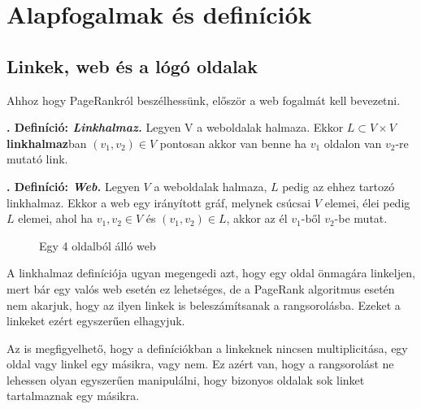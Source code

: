 \documentclass[12pt,a4paper]{article}
\newcounter{definicioszam}
\newenvironment{definicio}[1]
{{\medskip}\noindent \stepcounter{definicioszam}
{\bfseries{\thedefinicioszam. Definíció: \textit{#1.}}}}{\bigskip }
\begin{document}
\section{Alapfogalmak és definíciók}

\subsection{Linkek, web és a lógó oldalak}\label{link_web_logooldal}

Ahhoz hogy PageRankról beszélhessünk, először a web fogalmát kell bevezetni.

\begin{definicio}{Linkhalmaz}
	Legyen V a weboldalak halmaza. Ekkor $L \subset V \times V$ \textbf{linkhalmaz}ban $(v_1, v_2) \in V$ pontosan akkor van benne ha $v_1$ oldalon van $v_2$-re mutató link. 
\end{definicio}

\begin{definicio}{Web}
	Legyen $V$ a weboldalak halmaza, $L$ pedig az ehhez tartozó linkhalmaz. Ekkor a web egy irányított gráf, melynek csúcsai $V$ elemei, élei pedig $L$ elemei, ahol ha $v_1, v_2 \in V$ és $(v_1,v_2) \in L$, akkor az él $v_1$-ből $v_2$-be mutat. 
\end{definicio}

\begin{figure}[h]
	\centering
	\caption{Egy 4 oldalból álló web}
\end{figure}

A linkhalmaz definíciója ugyan megengedi azt, hogy egy oldal önmagára linkeljen, mert bár egy valós web esetén ez lehetséges, de a PageRank algoritmus esetén nem akarjuk, hogy az ilyen linkek is beleszámítsanak a rangsorolásba. Ezeket a linkeket ezért egyszerűen elhagyjuk.

Az is megfigyelhető, hogy a definíciókban a linkeknek nincsen multiplicitása, egy oldal vagy linkel egy másikra, vagy nem. Ez azért van, hogy a rangsorolást ne lehessen olyan egyszerűen manipulálni, hogy bizonyos oldalak sok linket tartalmaznak egy másikra.  
\end{document}
